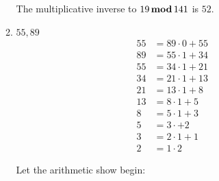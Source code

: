 \documentclass{report}
\newcommand{\mAlign}[1]{\begin{align*}#1\end{align*}}
\newcommand{\defaultEnumerateLabel}{\textbf{\alph*.}}
\newcommand{\modFunc}{\text{\,\textbf{mod}\,}}
\newcommand{\MyItem}[1]{\item #1\\}
\begin{document}
\begin{enumerate}[label=\defaultEnumerateLabel]
\begin{enumerate}[label=\defaultEnumerateLabel]
		The multiplicative inverse to $19 \modFunc 141$ is $52$.\\
		
		\MyItem{$55,89$}
		
		\mAlign{
			55 &= 89 \cdot 0 + 55 \\
			89 &= 55 \cdot 1 +34 \\
			55 &= 34 \cdot 1 + 21 \\
			34 &= 21 \cdot 1 + 13 \\
			21 &= 13 \cdot 1 + 8 \\
			13 &= 8 \cdot 1 + 5 \\
			8 &= 5 \cdot 1 + 3 \\
			5 &= 3 \cdot + 2 \\
			3 &= 2 \cdot 1 + 1 \\
			2 &= 1 \cdot 2
			}
		
		Let the arithmetic show begin:
		

\end{enumerate}
\end{enumerate}
\end{document}
